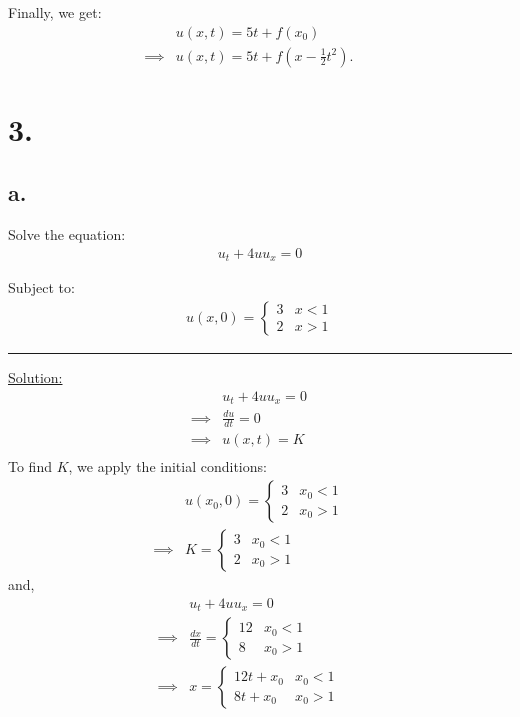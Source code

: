 \documentclass{article}
\begin{document}
Finally, we get:
\begin{align*}
  &u(x,t) = 5t + f(x_0) &&\\
  \implies& u(x,t) = 5t + f(x-\frac{1}{2}t^2).
\end{align*}

\newpage

\section*{3.}
\subsection*{a.}
Solve the equation:
\begin{align*}
  u_t + 4 u u_x = 0
\end{align*}

Subject to:
\begin{align*}
  u(x,0) = \begin{cases}
    3 & x < 1 \\
    2 & x > 1
  \end{cases}
\end{align*}

\begin{center}
  \noindent\rule{8cm}{0.4pt}
\end{center}

\underline{Solution:}
\begin{align*}
  &u_t + 4 u u_x = 0 &&\\
  \implies& \frac{du}{dt} = 0 &&\\
  \implies& u(x,t) = K &&\\
\end{align*}
To find $K$, we apply the initial conditions:
\begin{align*}
  &u(x_0,0) = \begin{cases}
    3 & x_0 < 1 \\
    2 & x_0 > 1
  \end{cases} &&\\
  \implies& K = \begin{cases}
    3 & x_0 < 1 \\
    2 & x_0 > 1
  \end{cases} 
\end{align*}
and,
\begin{align*}
  &u_t + 4 u u_x = 0 &&\\
  \implies& \frac{dx}{dt} = \begin{cases}
    12 & x_0 < 1 \\
    8 & x_0 > 1
  \end{cases}  &&\\
  \implies& x = \begin{cases}
    12t + x_0 & x_0 < 1 \\
    8t + x_0 & x_0 > 1
  \end{cases} &&\\
\end{align*}
\end{document}
